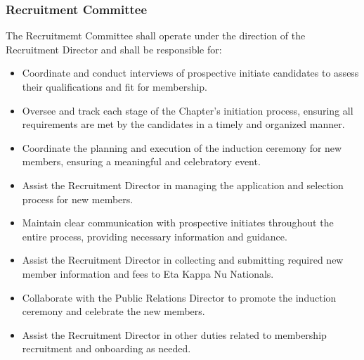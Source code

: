 \documentclass[10pt, oneside]{article}
\begin{document}
\subsubsection{Recruitment Committee}
The Recruitmemt Committee shall operate under the direction of the Recruitment Director and shall be responsible for:
\begin{itemize}
    \item Coordinate and conduct interviews of prospective initiate candidates to assess their qualifications and fit for membership.
    \item Oversee and track each stage of the Chapter's initiation process, ensuring all requirements are met by the candidates in a timely and organized manner.
    \item Coordinate the planning and execution of the induction ceremony for new members, ensuring a meaningful and celebratory event.
    \item Assist the Recruitment Director in managing the application and selection process for new members.
    \item Maintain clear communication with prospective initiates throughout the entire process, providing necessary information and guidance.
    \item Assist the Recruitment Director in collecting and submitting required new member information and fees to Eta Kappa Nu Nationals.
    \item Collaborate with the Public Relations Director to promote the induction ceremony and celebrate the new members.
    \item Assist the Recruitment Director in other duties related to membership recruitment and onboarding as needed.
\end{itemize}
\end{document}
